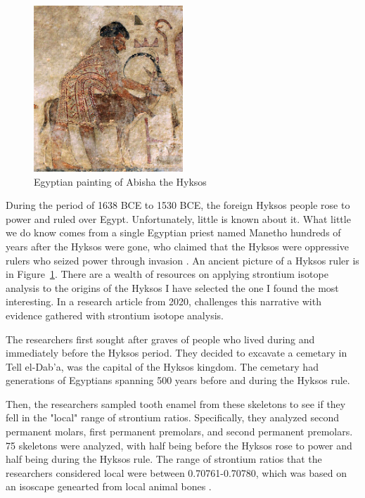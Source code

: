 \documentclass[a4paper, 12pt]{article}
\begin{document}
\begin{figure}[htbp]
    \centering
    \includegraphics[width=0.5\textwidth]{hyksos_painting.jpg}
    \caption{Egyptian painting of Abisha the Hyksos \citep{wikipediaHyksos}}
    \label{fig:hyksos_painting}
\end{figure}
During the period of 1638 BCE to 1530 BCE, the foreign Hyksos people rose to power
and ruled over Egypt. Unfortunately, little is known about it. What little we do know comes
from a single Egyptian priest named Manetho hundreds of years after the Hyksos were gone,
who claimed that the Hyksos were oppressive rulers who seized power through invasion \citep{stantis2020}.
An ancient picture of a Hyksos ruler is in Figure~\ref{fig:hyksos_painting}. There are a wealth
of resources on applying strontium isotope analysis to the origins of the Hyksos \citep*{stantis2020, stantis2021, weinstein2021, maaranen2019}
I have selected the one I found the most interesting. In a research article from 2020, \cite{stantis2020} challenges this narrative
with evidence gathered with strontium isotope analysis.

The researchers first sought after graves of people who lived during and immediately
before the Hyksos period. They decided to excavate a cemetary in Tell el-Dab'a,
was the capital of the Hyksos kingdom. The cemetary had generations of Egyptians spanning
500 years before and during the Hyksos rule.

Then, the researchers sampled tooth enamel from these skeletons to see if they fell
in the "local" range of strontium ratios. Specifically, they analyzed second permanent molars,
first permanent premolars, and second permanent premolars. 75 skeletons were analyzed,
with half being before the Hyksos rose to power and half being during the Hyksos rule.
The range of strontium ratios that the researchers considered local were
between 0.70761-0.70780, which was based on an isoscape genearted from local animal bones \citep{bournemouth2020}.
\end{document}
